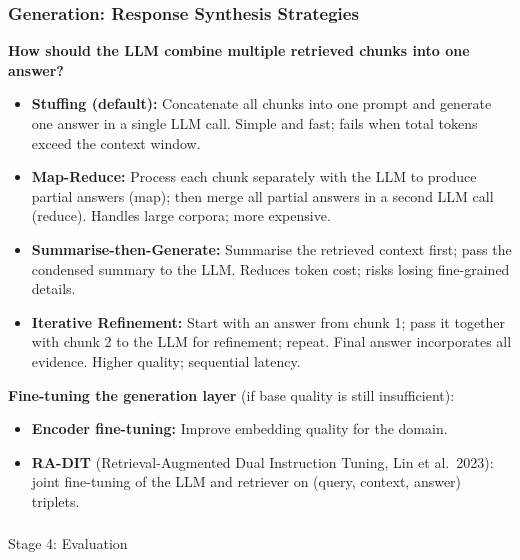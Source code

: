 \begin{frame}[fragile]\frametitle{Generation: Response Synthesis Strategies}

\textbf{How should the LLM combine multiple retrieved chunks into one answer?}

\begin{itemize}
  \item \textbf{Stuffing (default):} Concatenate all chunks into one prompt and generate one answer in a single LLM call. Simple and fast; fails when total tokens exceed the context window.

  \item \textbf{Map-Reduce:} Process each chunk separately with the LLM to produce partial answers (map); then merge all partial answers in a second LLM call (reduce). Handles large corpora; more expensive.

  \item \textbf{Summarise-then-Generate:} Summarise the retrieved context first; pass the condensed summary to the LLM. Reduces token cost; risks losing fine-grained details.

  \item \textbf{Iterative Refinement:} Start with an answer from chunk 1; pass it together with chunk 2 to the LLM for refinement; repeat. Final answer incorporates all evidence. Higher quality; sequential latency.
\end{itemize}

\vspace{0.3em}
\textbf{Fine-tuning the generation layer} (if base quality is still insufficient):
\begin{itemize}
  \item \textbf{Encoder fine-tuning:} Improve embedding quality for the domain.
  \item \textbf{RA-DIT} (Retrieval-Augmented Dual Instruction Tuning, Lin et al.\ 2023): joint fine-tuning of the LLM and retriever on (query, context, answer) triplets.
\end{itemize}

\end{frame}



\begin{frame}[fragile]\frametitle{}
\begin{center}
{\Large Stage 4: Evaluation}
\end{center}
\end{frame}

